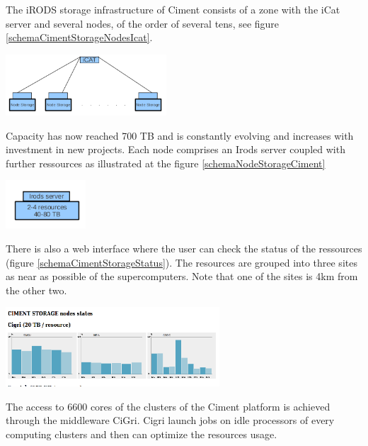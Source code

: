 \documentclass[a4paper, 10pt]{article}
\begin{document}
\begin{multicols}{2}
The iRODS storage infrastructure of Ciment consists of a zone with the iCat server and several nodes, of the order of several tens,
see figure \ref{schemaCimentStorageNodesIcat}.

\begin{center}%
\centering
{}
\includegraphics[width=6cm]{schemaCimentStorageNodesIcat.png}
\end{center}

Capacity has now reached 700 TB and is constantly evolving and increases with investment in new projects.
Each node comprises an Irods server coupled with further ressources as illustrated at the figure \ref{schemaNodeStorageCiment}

\begin{center}%
\centering
{}
\includegraphics[width=3cm]{schemaNodeStorageCiment.png}
\end{center}

There is also a web interface where the user can check the status of the ressources (figure \ref{schemaCimentStorageStatus}).
The resources are grouped into three sites as near as possible of the supercomputers.
Note that one of the sites is 4km from the other two.

\begin{center}%
\centering
{}
\includegraphics[width=8cm]{schemaCimentStorageStatus.png}
\end{center}

The access to 6600 cores of the clusters of the Ciment platform is achieved through the middleware CiGri.
Cigri launch jobs on idle processors of every computing clusters and then can optimize the resources usage.


\end{multicols}
\end{document}

